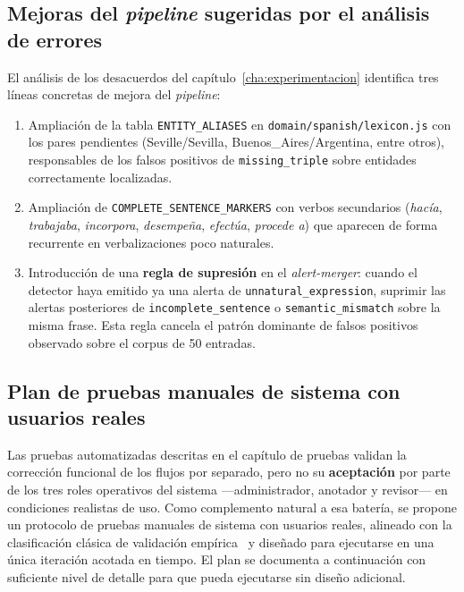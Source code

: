 \subsection{Mejoras del \textit{pipeline} sugeridas por el análisis de errores}

El análisis de los desacuerdos del capítulo~\ref{cha:experimentacion}
identifica tres líneas concretas de mejora del \textit{pipeline}:

\begin{enumerate}
	\item Ampliación de la tabla \texttt{ENTITY\_ALIASES} en
	      \texttt{domain/spanish/lexicon.js} con los pares pendientes (Seville/Sevilla,
	      Buenos\_Aires/Argentina, entre otros), responsables de los falsos positivos de
	      \texttt{missing\_triple} sobre entidades correctamente localizadas.
	\item Ampliación de \texttt{COMPLETE\_SENTENCE\_MARKERS} con verbos secundarios
	      (\textit{hacía}, \textit{trabajaba}, \textit{incorpora}, \textit{desempeña},
	      \textit{efectúa}, \textit{procede a}) que aparecen de forma recurrente en
	      verbalizaciones poco naturales.
	\item Introducción de una \textbf{regla de supresión} en el \textit{alert-merger}:
	      cuando el detector haya emitido ya una alerta de
	      \texttt{unnatural\_expression}, suprimir las alertas posteriores de
	      \texttt{incomplete\_sentence} o \texttt{semantic\_mismatch} sobre la misma
	      frase. Esta regla cancela el patrón dominante de falsos positivos observado
	      sobre el corpus de 50 entradas.
\end{enumerate}

\subsection{Plan de pruebas manuales de sistema con usuarios reales}
\label{sec:future-work-pruebas-usuario}

Las pruebas automatizadas descritas en el capítulo de pruebas validan la
corrección funcional de los flujos por separado, pero no su \textbf{aceptación}
por parte de los tres roles operativos del sistema ---administrador, anotador y
revisor--- en condiciones realistas de uso. Como complemento natural a esa
batería, se propone un protocolo de pruebas manuales de sistema con usuarios
reales, alineado con la clasificación clásica de validación
empírica~\cite{Wohlin2012} y diseñado para ejecutarse en una única iteración
acotada en tiempo. El plan se documenta a continuación con suficiente nivel de
detalle para que pueda ejecutarse sin diseño adicional.

